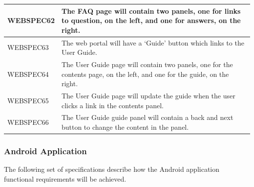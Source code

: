 \documentclass[11pt,a4paper]{article}
\begin{document}
\begin{longtable}{|p{2.5cm}p{13cm}|}
WEBSPEC62 & The FAQ page will contain two panels, one for links to question, on the left, and one for answers, on the right. \\ \hline
WEBSPEC63 & The web portal will have a `Guide' button which links to the User Guide. \\ \hline
WEBSPEC64 & The User Guide page will contain two panels, one for the contents page, on the left, and one for the guide, on the right. \\ \hline
WEBSPEC65 & The User Guide page will update the guide when the user clicks a link in the contents panel.  \\ \hline
WEBSPEC66 & The User Guide guide panel will contain a back and next button to change the content in the panel. \\ \hline
\end{longtable}

\subsubsection{Android Application}

The following set of specifications describe how the Android application functional requirements will be achieved.
\end{document}
